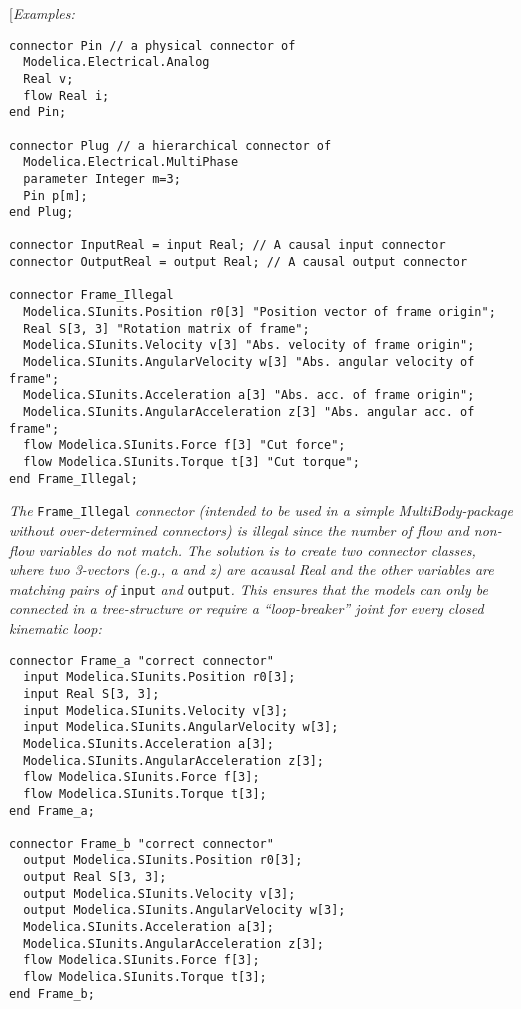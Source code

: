 {[}\emph{Examples:}

\begin{lstlisting}[language=modelica]
connector Pin // a physical connector of
  Modelica.Electrical.Analog
  Real v;
  flow Real i;
end Pin;

connector Plug // a hierarchical connector of
  Modelica.Electrical.MultiPhase
  parameter Integer m=3;
  Pin p[m];
end Plug;

connector InputReal = input Real; // A causal input connector
connector OutputReal = output Real; // A causal output connector

connector Frame_Illegal
  Modelica.SIunits.Position r0[3] "Position vector of frame origin";
  Real S[3, 3] "Rotation matrix of frame";
  Modelica.SIunits.Velocity v[3] "Abs. velocity of frame origin";
  Modelica.SIunits.AngularVelocity w[3] "Abs. angular velocity of frame";
  Modelica.SIunits.Acceleration a[3] "Abs. acc. of frame origin";
  Modelica.SIunits.AngularAcceleration z[3] "Abs. angular acc. of frame";
  flow Modelica.SIunits.Force f[3] "Cut force";
  flow Modelica.SIunits.Torque t[3] "Cut torque";
end Frame_Illegal;
\end{lstlisting}

\emph{The} \lstinline!Frame_Illegal! \emph{connector (intended to be used in a
simple MultiBody-package without over-determined connectors) is illegal
since the number of flow and non-flow variables do not match. The
solution is to create two connector classes, where two 3-vectors (e.g.,
a and z) are acausal Real and the other variables are matching pairs of}
\lstinline!input! \emph{and} \lstinline!output!\emph{. This ensures that the models can only be
connected in a tree-structure or require a ``loop-breaker'' joint for
every closed kinematic loop:}

\begin{lstlisting}[language=modelica]
connector Frame_a "correct connector"
  input Modelica.SIunits.Position r0[3];
  input Real S[3, 3];
  input Modelica.SIunits.Velocity v[3];
  input Modelica.SIunits.AngularVelocity w[3];
  Modelica.SIunits.Acceleration a[3];
  Modelica.SIunits.AngularAcceleration z[3];
  flow Modelica.SIunits.Force f[3];
  flow Modelica.SIunits.Torque t[3];
end Frame_a;

connector Frame_b "correct connector"
  output Modelica.SIunits.Position r0[3];
  output Real S[3, 3];
  output Modelica.SIunits.Velocity v[3];
  output Modelica.SIunits.AngularVelocity w[3];
  Modelica.SIunits.Acceleration a[3];
  Modelica.SIunits.AngularAcceleration z[3];
  flow Modelica.SIunits.Force f[3];
  flow Modelica.SIunits.Torque t[3];
end Frame_b;
\end{lstlisting}

